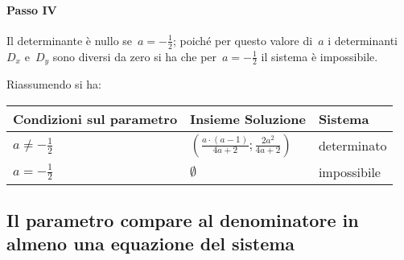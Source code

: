 \begin{exrig}
\begin{esempio}
\paragraph{Passo IV} Il determinante è nullo se~$a=-{\frac{1}{2}}$; poiché per questo valore di~$a$ i
determinanti~$D_{x}$ e~$D_{y}$ sono diversi da zero si ha che per~$a=-{\frac{1}{2}}$ il sistema
è impossibile.

Riassumendo si ha:
\begin{center}
 \begin{tabular}{lll}
\toprule
Condizioni sul parametro & Insieme Soluzione & Sistema\\
\midrule
$a\neq -{\frac{1}{2}}$ & $\left(\frac{a\cdot (a-1)}{4a+2};\frac{2a^{2}}{4a+2}\right)$ & determinato\\
$a=-{\frac{1}{2}}$ & $\emptyset $ & impossibile\\
\bottomrule
\end{tabular}
\end{center}
 \end{esempio}
\end{exrig}

\subsection*{Il parametro compare al denominatore in almeno una equazione del sistema}

